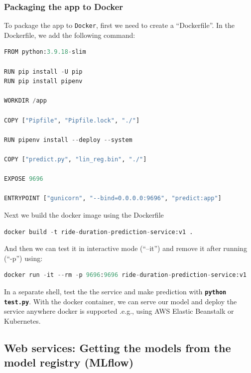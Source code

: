 \documentclass[letterpaper,12pt,notitlepage,twoside]{report}
\begin{document}
\subsubsection{Packaging the app to Docker}
To package the app to \texttt{Docker}, first we need to create a ``Dockerfile''. In the Dockerfile, we add the following command:
\begin{lstlisting}[language=python, numbers=none]
FROM python:3.9.18-slim

RUN pip install -U pip
RUN pip install pipenv

WORKDIR /app  

COPY ["Pipfile", "Pipfile.lock", "./"]

RUN pipenv install --deploy --system

COPY ["predict.py", "lin_reg.bin", "./"]

EXPOSE 9696

ENTRYPOINT ["gunicorn", "--bind=0.0.0.0:9696", "predict:app"]
\end{lstlisting}

Next we build the docker image using the Dockerfile
\begin{lstlisting}[language=python, numbers=none]
docker build -t ride-duration-prediction-service:v1 .
\end{lstlisting}

And then we can test it in interactive mode (``--it'') and remove it after running (``-p'') using:
\begin{lstlisting}[language=python, numbers=none]
docker run -it --rm -p 9696:9696 ride-duration-prediction-service:v1 
\end{lstlisting}

In a separate shell, test the the service and make prediction with \textbf{\texttt{python test.py}}. With the docker container, we can serve our model and deploy the service anywhere docker is supported .e.g., using AWS Elastic Beanstalk or Kubernetes.

\subsection{Web services: Getting the models from the model registry (MLflow)}
\end{document}
